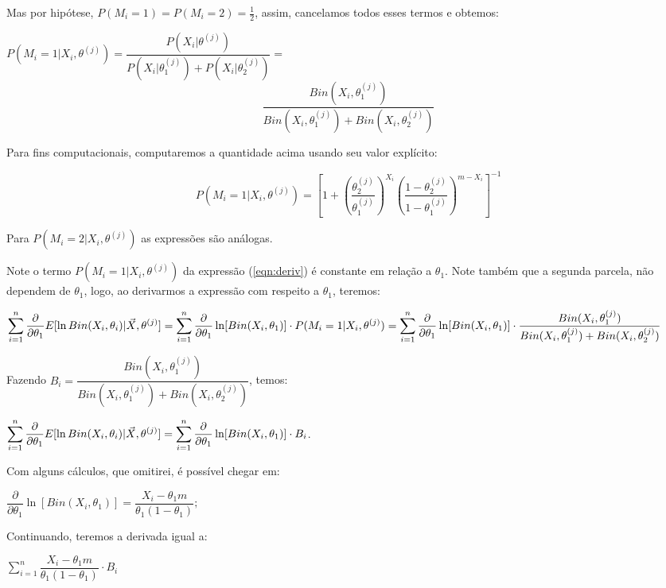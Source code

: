 \documentclass[12pt]{article}
\begin{document}
Mas por hipótese, $P(M_i=1)=P(M_i=2)=\frac12$, assim, cancelamos todos esses termos e obtemos:

$P(M_i=1|X_i,\theta^{(j)})=\dfrac{P(X_i|\theta^{(j)})}{P(X_i|\theta_1^{(j)})+P(X_i|\theta_2^{(j)})}=$
\begin{equation}
    \label{bi1}
    \dfrac{Bin(X_i,\theta_1^{(j)})}{Bin(X_i,\theta_1^{(j)})+Bin(X_i,\theta_2^{(j)})}
\end{equation}


Para fins computacionais\cite{bin}, computaremos a quantidade acima usando seu valor explícito:

\begin{equation}
    \label{eqn:compute}
    P(M_i=1|X_i,\theta^{(j)})=\left[1+\left(\dfrac{\theta_2^{(j)}}{\theta_1^{(j)}}\right)^{X_i}\left(\dfrac{1-\theta_2^{(j)}}{1-\theta_1^{(j)}}\right)^{m-X_i}\right]^{-1}
\end{equation}

Para $P(M_i=2|X_i,\theta^{(j)})$ as expressões são análogas.


Note o termo $P(M_i=1|X_i,\theta^{(j)})$  da expressão (\ref{eqn:deriv}) é constante em relação a $\theta_1$. Note também que a segunda parcela, não dependem de $\theta_1$, logo, ao derivarmos a expressão com respeito a $\theta_1$, teremos:

$\displaystyle\sum_{i=1}^n\dfrac{\partial}{\partial \theta_1}E[\ln Bin(X_i,\theta_i)|\vec X,\theta^{(j)}]
\\
=\sum_{i=1}^n\dfrac{\partial}{\partial \theta_1}\ln[Bin(X_i,\theta_1)]\cdot P(M_i=1|X_i,\theta^{(j)})\\
=\sum_{i=1}^n\dfrac{\partial}{\partial \theta_1}\ln[Bin(X_i,\theta_1)]\cdot \dfrac{Bin(X_i,\theta_1^{(j)})}{Bin(X_i,\theta_1^{(j)})+Bin(X_i,\theta_2^{(j)})}$

Fazendo $B_i=\dfrac{Bin(X_i,\theta_1^{(j)})}{Bin(X_i,\theta_1^{(j)})+Bin(X_i,\theta_2^{(j)})}$, temos:

$\displaystyle\sum_{i=1}^n\dfrac{\partial}{\partial \theta_1}E[\ln Bin(X_i,\theta_i)|\vec X,\theta^{(j)}]\\
=\sum_{i=1}^n\dfrac{\partial}{\partial \theta_1}\ln[Bin(X_i,\theta_1)]\cdot B_i$.

Com alguns cálculos, que omitirei, é possível chegar em:

$\dfrac{\partial}{\partial \theta_1}\ln[Bin(X_i,\theta_1)]=\dfrac{X_i-\theta_1 m}{\theta_1(1-\theta_1)};$

Continuando, teremos a derivada igual a:

$\displaystyle\sum_{i=1}^n \dfrac{X_i-\theta_1 m}{\theta_1(1-\theta_1)}\cdot B_i$
\end{document}
